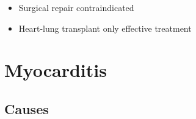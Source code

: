 \documentclass[
  12pt,
]{memoir}
\providecommand{\tightlist}{%
  \setlength{\itemsep}{0pt}\setlength{\parskip}{0pt}}
\begin{document}
\begin{itemize}
\begin{itemize}
    \begin{itemize}
    \tightlist
    \item
      Surgical repair contraindicated
    \item
      Heart-lung transplant only effective treatment
    \end{itemize}
  \end{itemize}
\end{itemize}

\hypertarget{myocarditis}{%
\section{Myocarditis}\label{myocarditis}}

\hypertarget{causes-2}{%
\subsection{Causes}\label{causes-2}}
\end{document}
